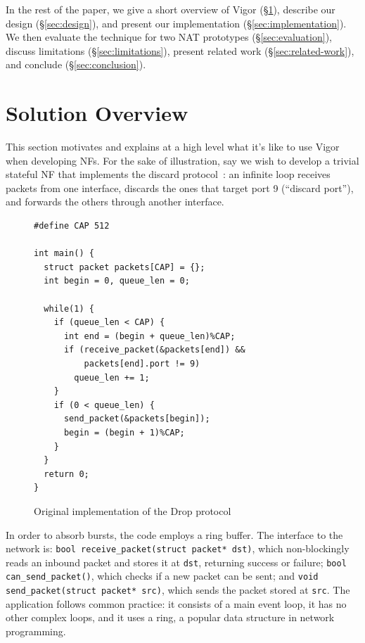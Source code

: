 \documentclass[letterpaper,twocolumn,10pt]{article}
\newcommand{\code}[1]{\lstinline{#1}}
\begin{document}
In the rest of the paper, we give a short overview of Vigor
(\S\ref{sec:solution-overview}), describe our design (\S\ref{sec:design}), and
present our implementation (\S\ref{sec:implementation}). We then evaluate the
technique for two NAT prototypes (\S\ref{sec:evaluation}), discuss limitations
(\S\ref{sec:limitations}), present related work (\S\ref{sec:related-work}), and
conclude (\S\ref{sec:conclusion}).


\section{Solution Overview}
\label{sec:solution-overview}

This section motivates and explains at a high level what it's like to use Vigor
when developing NFs. For the sake of illustration, say we wish to develop a
trivial stateful NF that implements the discard protocol~\cite{rfc863}: an
infinite loop receives packets from one interface, discards the ones that target
port 9 (``discard port''), and forwards the others through another interface.

\begin{figure}[h!]
\begin{lstlisting}
#define CAP 512

int main() {
  struct packet packets[CAP] = {};
  int begin = 0, queue_len = 0;

  while(1) {
    if (queue_len < CAP) {
      int end = (begin + queue_len)%CAP;
      if (receive_packet(&packets[end]) &&
          packets[end].port != 9)
        queue_len += 1;
    }
    if (0 < queue_len) {
      send_packet(&packets[begin]);
      begin = (begin + 1)%CAP;
    }
  }
  return 0;
}
\end{lstlisting}
  \caption{Original implementation of the Drop protocol}
  \label{lst:orig}
\end{figure}

In order to absorb bursts, the code employs a ring buffer. The interface to the
network is: \code{bool receive_packet(struct packet* dst)}, which non-blockingly
reads an inbound packet and stores it at \code{dst}, returning success or
failure; \code{bool can_send_packet()}, which checks if a new packet can be
sent; and \code{void send_packet(struct packet* src)}, which sends the packet
stored at \code{src}. The application follows common practice: it consists of a
main event loop, it has no other complex loops, and it uses a ring, a popular
data structure in network programming.
\end{document}
